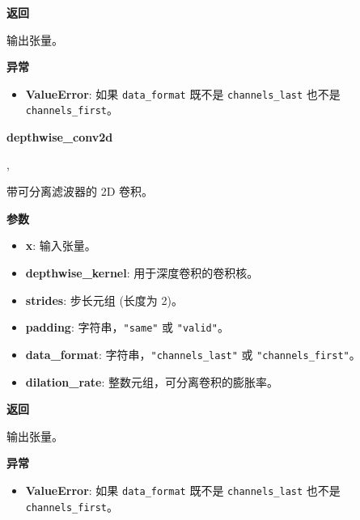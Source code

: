 \textbf{返回}

输出张量。

\textbf{异常}

\begin{itemize}
\tightlist
\item
  \textbf{ValueError}: 如果 \texttt{data\_format} 既不是
  \texttt{channels\_last} 也不是 \texttt{channels\_first}。
\end{itemize}


\textbf{depthwise\_conv2d}\label{depthwiseux5fconv2d}

\begin{Shaded}
\begin{Highlighting}[]
\OperatorTok{=}\NormalTok{(}\NormalTok{, }\OperatorTok{=}, \\
\hspace{3cm}\OperatorTok{=}\OperatorTok{=}\NormalTok{(}\NormalTok{, }\NormalTok{))}
\end{Highlighting}
\end{Shaded}

带可分离滤波器的 2D 卷积。

\textbf{参数}

\begin{itemize}
\tightlist
\item
  \textbf{x}: 输入张量。
\item
  \textbf{depthwise\_kernel}: 用于深度卷积的卷积核。
\item
  \textbf{strides}: 步长元组 (长度为 2)。
\item
  \textbf{padding}: 字符串，\texttt{"same"} 或 \texttt{"valid"}。
\item
  \textbf{data\_format}: 字符串，\texttt{"channels\_last"} 或
  \texttt{"channels\_first"}。
\item
  \textbf{dilation\_rate}: 整数元组，可分离卷积的膨胀率。
\end{itemize}

\textbf{返回}

输出张量。

\textbf{异常}

\begin{itemize}
\tightlist
\item
  \textbf{ValueError}: 如果 \texttt{data\_format} 既不是
  \texttt{channels\_last} 也不是 \texttt{channels\_first}。
\end{itemize}


